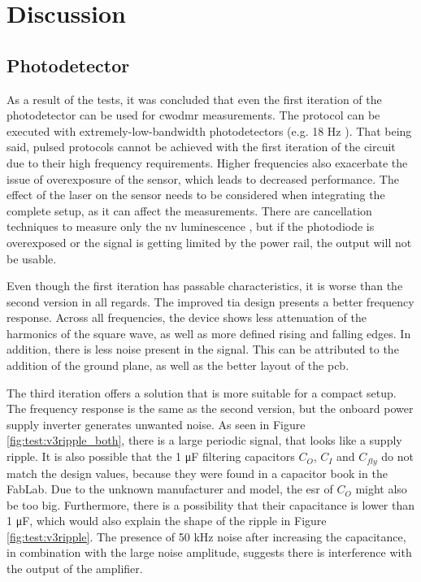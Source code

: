 \section{Discussion}

\subsection{Photodetector}
As a result of the tests, it was concluded that even the first iteration of the photodetector can be used for \gls{cwodmr} measurements. The protocol can be executed with extremely-low-bandwidth photodetectors (e.g. 18 \unit{\hertz} \cite{acharya2025compact}). That being said, pulsed protocols cannot be achieved with the first iteration of the circuit due to their high frequency requirements. Higher frequencies also exacerbate the issue of overexposure of the sensor, which leads to decreased performance. The effect of the laser on the sensor needs to be considered when integrating the complete setup, as it can affect the measurements. There are cancellation techniques to measure only the \gls{nv} luminescence \cite{sewani2020coherent}, but if the photodiode is overexposed or the signal is getting limited by the power rail, the output will not be usable. 

Even though the first iteration has passable characteristics, it is worse than the second version in all regards. The improved \gls{tia} design presents a better frequency response. Across all frequencies, the device shows less attenuation of the harmonics of the square wave, as well as more defined rising and falling edges. In addition, there is less noise present in the signal. This can be attributed to the addition of the ground plane, as well as the better layout of the \gls{pcb}. 

The third iteration offers a solution that is more suitable for a compact setup. The frequency response is the same as the second version, but the onboard power supply inverter generates unwanted noise. As seen in Figure \ref{fig:test:v3ripple_both}, there is a large periodic signal, that looks like a supply ripple. It is also possible that the 1 \unit{\micro\farad} filtering capacitors $C_O$, $C_I$ and $C_{fly}$ do not match the design values, because they were found in a capacitor book in the FabLab. Due to the unknown manufacturer and model, the \gls{esr} of $C_O$ might also be too big. Furthermore, there is a possibility that their capacitance is lower than 1 \unit{\micro\farad}, which would also explain the shape of the ripple in Figure \ref{fig:test:v3ripple}. The presence of 50 \unit{\kilo\hertz} noise after increasing the capacitance, in combination with the large noise amplitude, suggests there is interference with the output of the amplifier.

